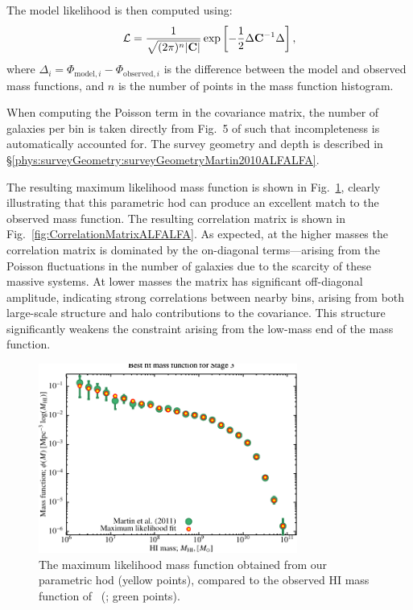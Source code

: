 The model likelihood is then computed using:
\begin{equation}
 \mathcal{L} = {1 \over \sqrt{(2 \pi)^n |\mathbf{C}|}} \exp\left[ -{1\over 2} \Delta \mathbf{C}^{-1} \Delta \right],
\end{equation}
where $\Delta_i = \Phi_{\mathrm{model}, i} - \Phi_{\mathrm{observed}, i}$ is the difference between the model and observed mass functions, and $n$ is the number of points in the mass function histogram.

When computing the Poisson term in the covariance matrix, the number of galaxies per bin is taken directly from Fig.~5 of \cite{martin_arecibo_2010} such that incompleteness is automatically accounted for. The survey geometry and depth is described in \S\ref{phys:surveyGeometry:surveyGeometryMartin2010ALFALFA}.

The resulting maximum likelihood mass function is shown in Fig.~\ref{fig:MaximumLikelihoodMassFunctionHOD}, clearly illustrating that this parametric \gls{hod} can produce an excellent match to the observed mass function. The resulting correlation matrix is shown in Fig.~\ref{fig:CorrelationMatrixALFALFA}. As expected, at the higher masses the correlation matrix is dominated by the on-diagonal terms---arising from the Poisson fluctuations in the number of galaxies due to the scarcity of these massive systems. At lower masses the matrix has significant off-diagonal amplitude, indicating strong correlations between nearby bins, arising from both large-scale structure and halo contributions to the covariance. This structure significantly weakens the constraint arising from the low-mass end of the mass function.

\begin{figure}
 \includegraphics[width=85mm,trim=0mm 0mm 0mm 2.5mm,clip]{Plots/DataAnalysis/alfalfaHIMassFunctionBestFit.pdf}
 \caption{The maximum likelihood mass function obtained from our parametric \protect\gls{hod} (yellow points), compared to the observed HI mass function of \protect\citeauthor{martin_arecibo_2010}~(\citeyear{martin_arecibo_2010}; green points).}
 \label{fig:MaximumLikelihoodMassFunctionHOD}
\end{figure}

